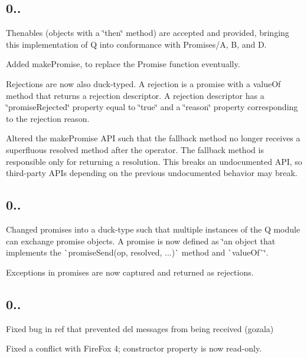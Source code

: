 \subsection*{0..}


\begin{DoxyItemize}
\item Thenables (objects with a \char`\"{}then\char`\"{} method) are accepted and provided, bringing this implementation of Q into conformance with Promises/A, B, and D.
\item Added {\ttfamily make\+Promise}, to replace the {\ttfamily Promise} function eventually.
\item Rejections are now also duck-\/typed. A rejection is a promise with a value\+Of method that returns a rejection descriptor. A rejection descriptor has a \char`\"{}promise\+Rejected\char`\"{} property equal to \char`\"{}true\char`\"{} and a \char`\"{}reason\char`\"{} property corresponding to the rejection reason.
\item Altered the {\ttfamily make\+Promise} A\+PI such that the {\ttfamily fallback} method no longer receives a superfluous {\ttfamily resolved} method after the {\ttfamily operator}. The fallback method is responsible only for returning a resolution. This breaks an undocumented A\+PI, so third-\/party A\+PI\textquotesingle{}s depending on the previous undocumented behavior may break.
\end{DoxyItemize}

\subsection*{0..}


\begin{DoxyItemize}
\item Changed promises into a duck-\/type such that multiple instances of the Q module can exchange promise objects. A promise is now defined as \char`\"{}an object that implements the
   \`{}promise\+Send(op, resolved, ...)\`{} method and \`{}value\+Of\`{}\char`\"{}.
\item Exceptions in promises are now captured and returned as rejections.
\end{DoxyItemize}

\subsection*{0..}


\begin{DoxyItemize}
\item Fixed bug in {\ttfamily ref} that prevented {\ttfamily del} messages from being received (gozala)
\item Fixed a conflict with Fire\+Fox 4; constructor property is now read-\/only.
\end{DoxyItemize}

